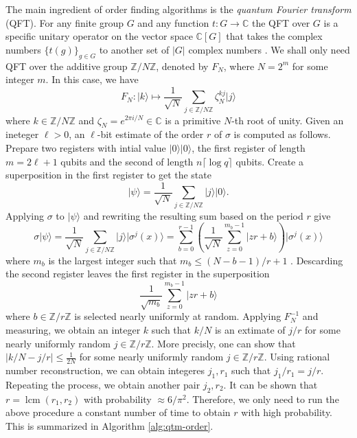 \documentclass{article}
\theoremstyle{plain}
\theoremstyle{definition}
\newcommand{\ldbrac}[1]{\lvert#1\rangle}
\newcommand{\abs}[1]{\left\vert#1\right\vert}
\DeclareMathOperator{\lcm}{lcm} %
\def\C{\ensuremath{\mathbb{C}}}
\def\Z{\ensuremath{\mathbb{Z}}}
\begin{document}
The main ingredient of order finding algorithms is the \textit{quantum Fourier transform} (QFT). 
For any finite group $G$ and any function $t: G \rightarrow \C$ the QFT over $G$ is a specific 
unitary operator on the vector space $\C[G]$ that takes the complex numbers $\{ t(g) \}_{g \in 
G}$ to another set of $\abs{G}$ complex numbers \cite{hallgren2003hidden}. We shall only need QFT 
over the additive group $\Z/N\Z$, denoted by $F_N$, where $N = 2^m$ for some integer $m$. In this 
case, we have 
\[ F_N: \ldbrac{k} \longmapsto \frac{1}{\sqrt{N}}\sum_{j \in \Z/N\Z}\zeta_N^{kj}\ldbrac{j} \]
where $k \in \Z/N\Z$ and $\zeta_N = e^{2\pi i / N} \in \C$ is a primitive $N$-th root of unity. 
Given an ineteger $\ell > 0$, an $\ell$-bit estimate of the order $r$ of $\sigma$ is computed as 
follows. Prepare two registers with intial value $\ldbrac{0}\ldbrac{0}$, the first register of 
length $m = 2\ell + 1$ qubits and the second of length $n\lceil \log q \rceil$ qubits. Create a 
superposition in the first register to get the state 
\[ \ldbrac{\psi} = \frac{1}{\sqrt{N}} \sum_{j \in \Z/N\Z} \ldbrac{j}\ldbrac{0}. \]
Applying $\sigma$ to $\ldbrac{\psi}$ and rewriting the resulting sum based on the period $r$ give
\[ \sigma\ldbrac{\psi} = \frac{1}{\sqrt{N}} \sum_{j \in \Z/N\Z} \ldbrac{j}\ldbrac{\sigma^j(x)} = 
\sum_{b = 0}^{r - 1}\left( \frac{1}{\sqrt{N}}\sum_{z = 0}^{m_b - 1}\ldbrac{zr + b} \right) 
\ldbrac{\sigma^j(x)} \]
where $m_b$ is the largest integer such that $m_b \le (N - b - 1) / r + 1$ 
\cite{kaye2007introduction}. Descarding the second register leaves the first register in the 
superposition
\[ \frac{1}{\sqrt{m_b}} \sum_{z = 0}^{m_b - 1}\ldbrac{zr + b} \]
where $b \in \Z/r\Z$ is selected nearly uniformly at random. Applying $F_N^{-1}$ and measuring, we 
obtain an integer $k$ such that $k / N$ is an extimate of $j / r$ for some nearly uniformly random 
$j \in \Z/r\Z$. More precisly, one can show that $\abs{k / N - j / r} \le \frac{1}{2N}$ for some 
nearly uniformly random $j \in \Z/r\Z$. Using rational number reconstruction, we can obtain 
integeres $j_1, r_1$ such that $j_1 / r_1 = j / r$. Repeating the process, we obtain another pair 
$j_2, r_2$. It can be shown that $r = \lcm(r_1, r_2)$ with probability $\approx 6 / \pi^2$. 
Therefore, we only need to run the above procedure a constant number of time to obtain $r$ with 
high probability. This is summarized in Algorithm \ref{alg:qtm-order}.
\end{document}

